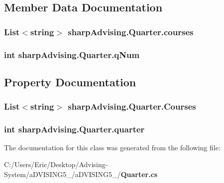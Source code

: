 \subsection{Member Data Documentation}
\subsubsection[{courses}]{\setlength{\rightskip}{0pt plus 5cm}List$<$string$>$ sharp\+Advising.\+Quarter.\+courses}\label{classsharp_advising_1_1_quarter_a78e8bd679064fd961706d0d5e2b02d31}
\subsubsection[{q\+Num}]{\setlength{\rightskip}{0pt plus 5cm}int sharp\+Advising.\+Quarter.\+q\+Num}\label{classsharp_advising_1_1_quarter_a767a29ceb561fdc4602d32c4a764d260}


\subsection{Property Documentation}
\subsubsection[{Courses}]{\setlength{\rightskip}{0pt plus 5cm}List$<$string$>$ sharp\+Advising.\+Quarter.\+Courses\hspace{0.3cm}{\ttfamily [get]}}\label{classsharp_advising_1_1_quarter_aeb3e8d21cfdd886c332aab4272e58d72}
\subsubsection[{quarter}]{\setlength{\rightskip}{0pt plus 5cm}int sharp\+Advising.\+Quarter.\+quarter\hspace{0.3cm}{\ttfamily [get]}}\label{classsharp_advising_1_1_quarter_ae1e49e31af402b9c7ace13c442bac6df}


The documentation for this class was generated from the following file\+:\begin{DoxyCompactItemize}
\item 
C\+:/\+Users/\+Eric/\+Desktop/\+Advising-\/\+System/a\+D\+V\+I\+S\+I\+N\+G5\+\_/a\+D\+V\+I\+S\+I\+N\+G5\+\_/{\bf Quarter.\+cs}\end{DoxyCompactItemize}

